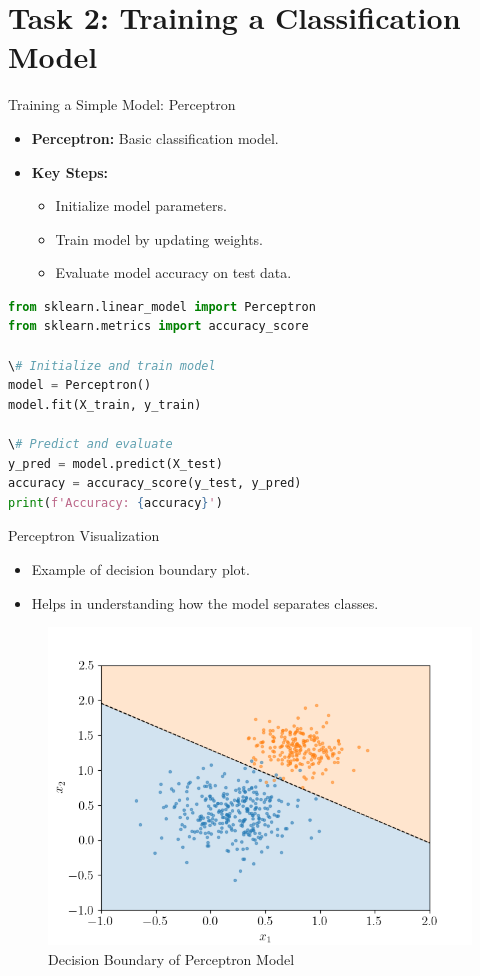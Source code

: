 \documentclass{beamer}
\begin{document}
\section{Task 2: Training a Classification Model}

\begin{frame}{Training a Simple Model: Perceptron}
\begin{itemize}
    \item \textbf{Perceptron:} Basic classification model.
    \item \textbf{Key Steps:}
    \begin{itemize}
        \item Initialize model parameters.
        \item Train model by updating weights.
        \item Evaluate model accuracy on test data.
    \end{itemize}
\end{itemize}
\begin{lstlisting}[language=Python, caption=Training a Perceptron Model]
from sklearn.linear_model import Perceptron
from sklearn.metrics import accuracy_score

\# Initialize and train model
model = Perceptron()
model.fit(X_train, y_train)

\# Predict and evaluate
y_pred = model.predict(X_test)
accuracy = accuracy_score(y_test, y_pred)
print(f'Accuracy: {accuracy}')
\end{lstlisting}
\end{frame}

\begin{frame}{Perceptron Visualization}
\begin{itemize}
    \item Example of decision boundary plot.
    \item Helps in understanding how the model separates classes.
\end{itemize}
\begin{figure}
    \centering
    \includegraphics[width=0.8\linewidth]{perceptron_decision_boundary.png}
    \caption{Decision Boundary of Perceptron Model}
\end{figure}
\end{frame}
\end{document}

